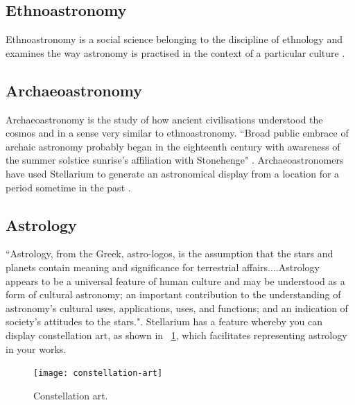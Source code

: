 \subsection{Ethnoastronomy}
Ethnoastronomy is a social science belonging to the discipline of ethnology and examines the way astronomy is practised in the context of a particular culture \cite{Salt2015}.

\subsection{Archaeoastronomy}
Archaeoastronomy is the study of how ancient civilisations understood the cosmos and in a sense very similar to ethnoastronomy.
``Broad public embrace of archaic astronomy probably began in the eighteenth
century with awareness of the summer solstice sunrise’s affiliation with Stonehenge" \cite[p.~263]{Krupp2015}.
Archaeoastronomers have used Stellarium to generate an astronomical display from a location for a period sometime in the past \cite{zotti2014towards}. 

\subsection{Astrology}
``Astrology, from the Greek, astro-logos, is the assumption that the stars and planets
contain meaning and significance for terrestrial affairs....Astrology appears to
be a universal feature of human culture and may be understood as a form of cultural
astronomy; an important contribution to the understanding of astronomy’s cultural
uses, applications, uses, and functions; and an indication of society’s attitudes to the
stars."\cite[p.~104]{Campion2015}. Stellarium has a feature whereby you can display constellation art, as shown in ~\ref{fig_constellation-art}, which facilitates representing astrology in your works. 

\begin{figure}[ht]
	\centerline{\texttt{[image: constellation-art]}}
	\caption{\label{fig_constellation-art}{Constellation art.}}
\end{figure}


	
